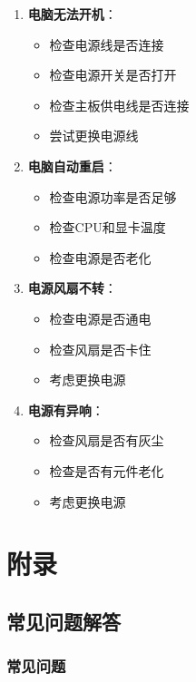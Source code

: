 \documentclass[12pt,UTF8]{ctexbook}
\begin{document}
\begin{enumerate}
    \item \textbf{电脑无法开机}：
    \begin{itemize}[leftmargin=2em]
        \item 检查电源线是否连接
        \item 检查电源开关是否打开
        \item 检查主板供电线是否连接
        \item 尝试更换电源线
    \end{itemize}
    
    \item \textbf{电脑自动重启}：
    \begin{itemize}[leftmargin=2em]
        \item 检查电源功率是否足够
        \item 检查CPU和显卡温度
        \item 检查电源是否老化
    \end{itemize}
    
    \item \textbf{电源风扇不转}：
    \begin{itemize}[leftmargin=2em]
        \item 检查电源是否通电
        \item 检查风扇是否卡住
        \item 考虑更换电源
    \end{itemize}
    
    \item \textbf{电源有异响}：
    \begin{itemize}[leftmargin=2em]
        \item 检查风扇是否有灰尘
        \item 检查是否有元件老化
        \item 考虑更换电源
    \end{itemize}
\end{enumerate}

\part{附录}

\chapter{常见问题解答}

\section{常见问题}
\end{document}
